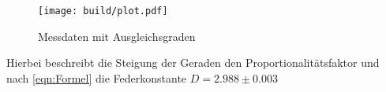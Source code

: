 \documentclass[titlepage = firstcover]{scrartcl}
\begin{document}
\begin{figure}[h]
  \centering
  \texttt{[image: build/plot.pdf]}
  \caption{Messdaten mit Ausgleichsgraden}
  \label{fig:Plot}
\end{figure}

Hierbei beschreibt die Steigung der Geraden den Proportionalitätsfaktor und
nach \eqref{eqn:Formel} die Federkonstante $D=2.988 \pm 0.003$

\end{document}
